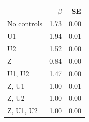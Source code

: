\begin{tabular}{lrr}
  \hline
 & $\beta$ & SE \\ 
  \hline
No controls & 1.73 & 0.00 \\ 
  U1 & 1.94 & 0.01 \\ 
  U2 & 1.52 & 0.00 \\ 
  Z & 0.84 & 0.00 \\ 
  U1, U2 & 1.47 & 0.00 \\ 
  Z, U1 & 1.00 & 0.01 \\ 
  Z, U2 & 1.00 & 0.00 \\ 
  Z, U1, U2 & 1.00 & 0.00 \\ 
   \hline
\end{tabular}
